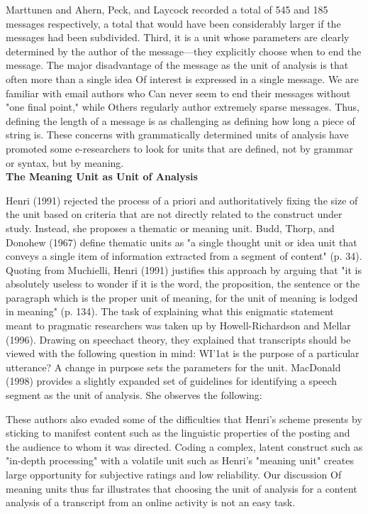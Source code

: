 \documentclass{book}
\begin{document}
Marttunen and Ahern, Peck, and Laycock recorded a total of 545 and 185 messages respectively, a total that would have been considerably larger if the messages had been subdivided. Third, it is a unit whose parameters are clearly determined by the author of the message—they explicitly choose when to end the message. The major disadvantage of the message as the unit of analysis is that often more than a single idea Of interest is expressed in a single message. We are familiar with email authors who Can never seem to end their messages without "one final point," while Others regularly author extremely sparse messages. Thus, defining the length of a message is as challenging as defining how long a piece of string is. These concerns with grammatically determined units of analysis have promoted some e-researchers to look for units that are defined, not by grammar or syntax, but by meaning.\\
\textbf{The Meaning Unit as Unit of Analysis}  \par
Henri (1991) rejected the process of a priori and authoritatively fixing the size of the unit based on criteria that are not directly related to the construct under study. Instead, she proposes a thematic or meaning unit. Budd, Thorp, and Donohew (1967) define thematic units as "a single thought unit or idea unit that conveys a single item of information extracted from a segment of content" (p. 34). Quoting from Muchielli, Henri (1991) justifies this approach by arguing that "it is absolutely useless to wonder if it is the word, the proposition, the sentence or the paragraph which is the proper unit of meaning, for the unit of meaning is lodged in meaning" (p. 134). The task of explaining what this enigmatic statement meant to pragmatic researchers was taken up by Howell-Richardson and Mellar (1996). Drawing on speechact theory, they explained that transcripts should be viewed with the following question in mind: WI'1at is the purpose of a particular utterance? A change in purpose sets the parameters for the unit. MacDonald (1998) provides a slightly expanded set of guidelines for identifying a speech segment as the unit of analysis. She observes the following:\par 
These authors also evaded some of the difficulties that Henri's scheme presents by sticking to manifest content such as the linguistic properties of the posting and the audience to whom it was directed. Coding a complex, latent construct such as "in-depth processing" with a volatile unit such as Henri's "meaning unit" creates large opportunity for subjective ratings and low reliability. Our discussion Of meaning units thus far illustrates that choosing the unit of analysis for a content analysis of a transcript from an online activity is not an easy task.\par 
\end{document}
